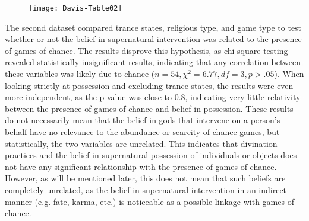 \begin{figure}[!htb] %
	\texttt{[image: Davis-Table02]}
	\centering
	\label{fig:Davis-Table02}
\end{figure}

The second dataset compared trance states, religious type, and game type to test whether or not the belief in supernatural intervention was related to the presence of games of chance. The results disprove this hypothesis, as chi-square testing revealed statistically insignificant results, indicating that any correlation between these variables was likely due to chance ($n = 54, \chi^{2} = 6.77, df = 3, p > .05$).  When looking strictly at possession and excluding trance states, the results were even more independent, as the p-value was close to 0.8, indicating very little relativity between the presence of games of chance and belief in possession. These results do not necessarily mean that the belief in gods that intervene on a person’s behalf have no relevance to the abundance or scarcity of chance games, but statistically, the two variables are unrelated. This indicates that divination practices and the belief in supernatural possession of individuals or objects does not have any significant relationship with the presence of games of chance. However, as will be mentioned later, this does not mean that such beliefs are completely unrelated, as the belief in supernatural intervention in an indirect manner (e.g. fate, karma, etc.) is noticeable as a possible linkage with games of chance.

